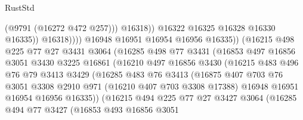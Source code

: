 \begin{lexlean}{RustStd}
\begin{coremodule}
                                        (@9791 (@16272 @472 @257)))
                                      @16318))
                                  @16322
                                  @16325
                                  @16328
                                  @16330
                                  @16335))
                              @16318))))
                      @16948
                      @16951
                      @16954
                      @16956
                      @16335))
                  (@16215
                    @498
                    @225
                    @77
                    @27
                    @3431
                    @3064
                    (@16285
                      @498
                      @77
                      @3431
                      (@16853
                        @497
                        @16856
                        @3051
                        @3430
                        @3225
                        @16861
                        (@16210
                          @497
                          @16856
                          @3430
                          (@16215
                            @483
                            @496
                            @76
                            @79
                            @3413
                            @3429
                            (@16285
                              @483
                              @76
                              @3413
                              (@16875
                                @407
                                @703
                                @76
                                @3051
                                @3308
                                @2910
                                @971
                                (@16210 @407 @703 @3308 @17388)
                                @16948
                                @16951
                                @16954
                                @16956
                                @16335))
                            (@16215
                              @494
                              @225
                              @77
                              @27
                              @3427
                              @3064
                              (@16285
                                @494
                                @77
                                @3427
                                (@16853
                                  @493
                                  @16856
                                  @3051

\end{coremodule}
\end{lexlean}
